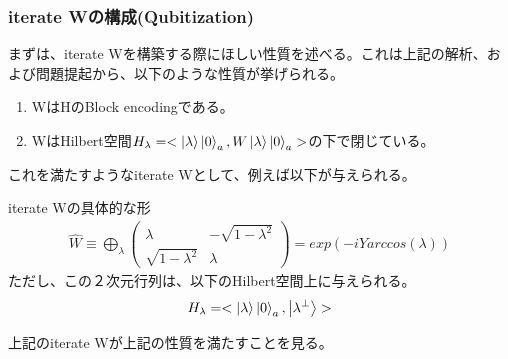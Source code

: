 \documentclass[a4paper,10.5pt]{article}
\numberwithin{equation}{section}
\begin{document}
\subsubsection{iterate Wの構成(Qubitization)}
まずは、iterate Wを構築する際にほしい性質を述べる。これは上記の解析、および問題提起から、以下のような性質が挙げられる。
\begin{enumerate}
    \item WはHのBlock encodingである。
    \item WはHilbert空間$H_{\lambda}=<\ket{\lambda}\ket{0}_{a},W\ket{\lambda}\ket{0}_{a}>$の下で閉じている。
\end{enumerate}
これを満たすようなiterate Wとして、例えば以下が与えられる。
\begin{resultbox}{iterate Wの具体的な形}
    \begin{align*}
        \hat{W}\equiv \bigoplus_{\lambda} \begin{pmatrix}
            \lambda & -\sqrt{1-\lambda^{2}}\\
            \sqrt{1-\lambda^{2}} & \lambda
        \end{pmatrix} =exp(-iYarccos(\lambda))
    \end{align*}
    ただし、この２次元行列は、以下のHilbert空間上に与えられる。
    \begin{align*}
        H_{\lambda}=<\ket{\lambda}\ket{0}_{a},\ket{\lambda^{\perp}}>
    \end{align*}
\end{resultbox}
上記のiterate Wが上記の性質を満たすことを見る。
\end{document}
